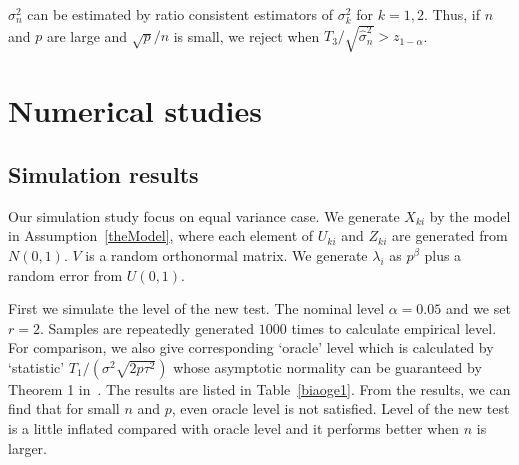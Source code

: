 \documentclass[review]{elsarticle}
\theoremstyle{plain}
\theoremstyle{definition}
\theoremstyle{remark}
\begin{document}
 $\sigma_n^2$ can be estimated by ratio consistent estimators of $\sigma^2_k$ for $k=1,2$. Thus, if $n$ and $p$ are large and ${\sqrt{p}}/{n}$ is small, we reject when $T_3/\sqrt{\hat{\sigma}_n^2}>z_{1-\alpha}$. 




\section{Numerical studies}
\subsection{Simulation results}

Our simulation study focus on equal variance case. 
We generate $X_{ki}$ by the model in Assumption~\ref{theModel}, where each element of $U_{ki}$ and $Z_{ki}$ are generated from $N(0,1)$.
$V$ is a random orthonormal matrix. 
We generate $\lambda_i$ as $p^{\beta}$ plus a random error from $U(0,1)$.


First we simulate the level of the new test. The nominal level $\alpha=0.05$ and we set $r=2$. Samples are repeatedly generated $1000$ times to calculate empirical level.  For comparison, we also give corresponding `oracle' level which is calculated by `statistic' ${T_1}/(\sigma^2\sqrt{2p\tau^2})$ whose asymptotic normality can be guaranteed by Theorem 1 in~\cite{Chen2010A}. The results are listed in
Table~\ref{biaoge1}. From the results, we can find that for small $n$ and $p$, even oracle level is not satisfied. Level of the new test is  a little inflated compared with oracle level and it performs better when $n$ is larger.
\end{document}
